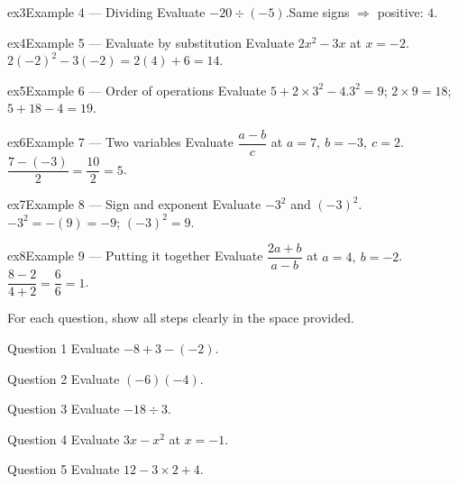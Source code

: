 \documentclass[11pt]{article}
\begin{document}
\begin{example}{ex3}{Example 4 --- Dividing}
Evaluate $-20\div(-5)$.\soln Same signs $\Rightarrow$ positive: $4$.
\end{example}

\begin{example}{ex4}{Example 5 --- Evaluate by substitution}
Evaluate $2x^2-3x$ at $x=-2$.\soln $2(-2)^2-3(-2)=2(4)+6=14$.
\end{example}

\begin{example}{ex5}{Example 6 --- Order of operations}
Evaluate $5+2\times3^2-4$.\soln $3^2=9$; $2\times9=18$; $5+18-4=19$.
\end{example}

\begin{example}{ex6}{Example 7 --- Two variables}
Evaluate $\dfrac{a-b}{c}$ at $a=7,\ b=-3,\ c=2$.\soln $\dfrac{7-(-3)}{2}=\dfrac{10}{2}=5$.
\end{example}

\begin{example}{ex7}{Example 8 --- Sign and exponent}
Evaluate $-3^2$ and $(-3)^2$.\soln $-3^2=-(9)=-9$; $(-3)^2=9$.
\end{example}

\begin{example}{ex8}{Example 9 --- Putting it together}
Evaluate $\dfrac{2a+b}{a-b}$ at $a=4,\ b=-2$.\soln $\dfrac{8-2}{4+2}=\dfrac{6}{6}=1$.
\end{example}

\clearpage
{}
For each question, show all steps clearly in the space provided.

\begin{qbox}{Question 1}
Evaluate $-8+3-(-2)$.\workspace{1.8cm}
\end{qbox}

\begin{qbox}{Question 2}
Evaluate $(-6)(-4)$.\workspace{1.8cm}
\end{qbox}

\begin{qbox}{Question 3}
Evaluate $-18\div3$.\workspace{1.8cm}
\end{qbox}

\begin{qbox}{Question 4}
Evaluate $3x-x^2$ at $x=-1$.\workspace{2.0cm}
\end{qbox}

\begin{qbox}{Question 5}
Evaluate $12-3\times2+4$.\workspace{1.8cm}
\end{qbox}
\end{document}
